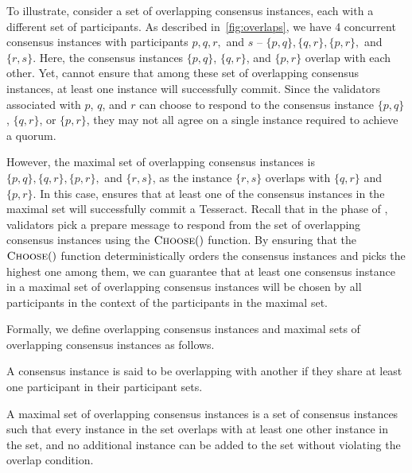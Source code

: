 To illustrate, consider a set of overlapping consensus instances, each with a different set of participants. As described in~\cref{fig:overlaps}, we have 4 concurrent consensus instances with participants $p,q,r,$ and $s$ -- $\{p,q\}, \{q,r\}, \{p,r\},$ and $\{r,s\}$. Here, the consensus instances $\{p,q\}$, $\{q,r\}$, and $\{p,r\}$ overlap with each other. Yet, \codename{} cannot ensure that among these set of overlapping consensus instances, at least one instance will successfully commit. Since the validators associated with $p$, $q$, and $r$ can choose to respond to the consensus instance $\{p,q\}$, $\{q,r\}$, or $\{p,r\}$, they may not all agree on a single instance required to achieve a quorum.

However, the maximal set of overlapping consensus instances is $\{p,q\}, \{q,r\}, \{p,r\},$ and $\{r,s\}$, as the instance $\{r,s\}$ overlaps with $\{q,r\}$ and $\{p,r\}$. In this case, \codename{} ensures that at least one of the consensus instances in the maximal set will successfully commit a Tesseract. Recall that in the  phase of \codename{}, validators pick a prepare message to respond from the set of overlapping consensus instances using the $\mathrm{\textsc{Choose}}()$ function. By ensuring that the $\mathrm{\textsc{Choose}}()$ function deterministically orders the consensus instances and picks the highest one among them, we can guarantee that at least one consensus instance in a maximal set of overlapping consensus instances will be chosen by all participants in the context of the participants in the maximal set.

Formally, we define overlapping consensus instances and maximal sets of overlapping consensus instances as follows.

\begin{definition}
    A consensus instance is said to be overlapping with another if they share at least one participant in their participant sets.
\end{definition}

\begin{definition}
    A maximal set of overlapping consensus instances is a set of consensus instances such that every instance in the set overlaps with at least one other instance in the set, and no additional instance can be added to the set without violating the overlap condition.
\end{definition}


